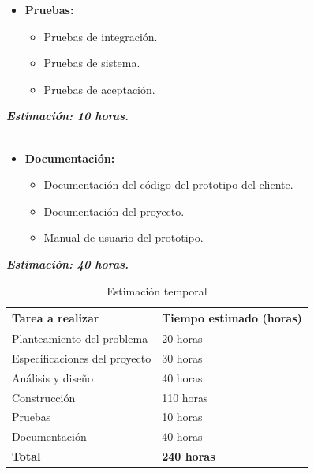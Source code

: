 \begin{itemize}
  \item \textbf{Pruebas:}
  \begin{itemize}
    \item Pruebas de integración.
    \item Pruebas de sistema.
    \item Pruebas de aceptación.
  \end{itemize}
\end{itemize}
\textit{\textbf{Estimación: 10 horas.}}\\ \\


\begin{itemize}
  \item \textbf{Documentación:}
  \begin{itemize}
    \item Documentación del código del prototipo del cliente.
    \item Documentación del proyecto.
    \item Manual de usuario del prototipo.
  \end{itemize}
\end{itemize}
\textit{\textbf{Estimación: 40 horas.}}\\


\begin{table}[h]
\centering
\label{table:tiempoEstimado}
\begin{tabular}{ll}
\hline
{\bf Tarea a realizar}                   & {\bf Tiempo estimado (horas)} \\ \hline
Planteamiento del problema    & 20 horas                            \\
Especificaciones del proyecto & 30 horas                            \\
Análisis y diseño             & 40 horas                            \\
Construcción                  & 110 horas                           \\
Pruebas                       & 10 horas                            \\
Documentación                 & 40 horas                            \\
{\bf Total}                   & {\bf 240 horas}                           \\ \hline
\end{tabular}
\caption{Estimación temporal}
\end{table}


